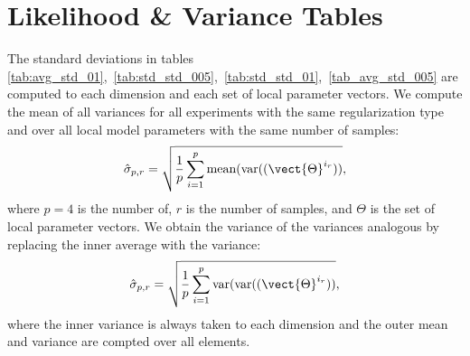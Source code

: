 \section{Likelihood \& Variance Tables}
The standard deviations in tables \ref{tab:avg_std_01},~\ref{tab:std_std_005},~\ref{tab:std_std_01},~\ref{tab_avg_std_005} are computed \wrt to each dimension and each set of local parameter vectors.
We compute the mean of all variances for all experiments with the same regularization type and over all local model parameters with the same number of samples:
\begin{equation}
    \label{eq:meanvar}
    \hat{\sigma}_{p,r} = \sqrt{\frac{1}{p} \sum_{i=1}^p \text{mean}(\text{var}((\vect{\Theta}^{i_r}))},
\end{equation}
where $p=4$ is the number of, $r$ is the number of samples, and $\Theta$ is the set of local parameter vectors.
We obtain the variance of the variances analogous by replacing the inner average with the variance:
\begin{equation}
    \label{eq:varvar}
    \hat{\sigma}_{p,r} = \sqrt{\frac{1}{p} \sum_{i=1}^p \text{var}(\text{var}((\vect{\Theta}^{i_r}))},
\end{equation}
where the inner variance is always taken \wrt to each dimension and the outer mean and variance are compted over all elements.

